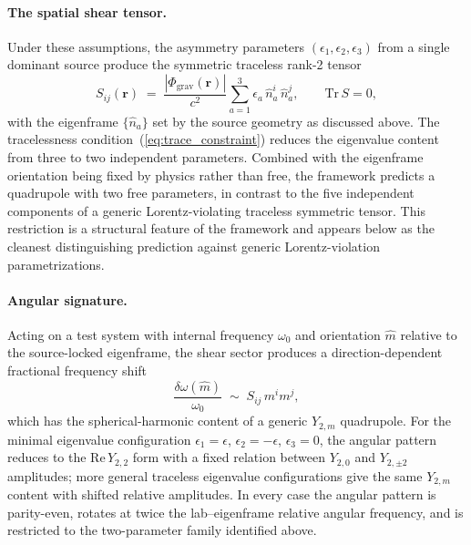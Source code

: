 \documentclass[pdflatex,sn-mathphys-num]{sn-jnl}%
\theoremstyle{thmstyleone}%
\theoremstyle{thmstyletwo}%
\theoremstyle{thmstylethree}%
\begin{document}
\paragraph{The spatial shear tensor.}
Under these assumptions, the asymmetry parameters
$(\epsilon_1,\epsilon_2,\epsilon_3)$ from a single dominant
source produce the symmetric traceless rank-2 tensor
\begin{equation}
    S_{ij}(\mathbf{r})
    \;=\;
    \frac{|\Phi_{\mathrm{grav}}(\mathbf{r})|}{c^2}
    \sum_{a=1}^{3}\epsilon_a\,\hat{n}_a^i\,\hat{n}_a^j,
    \qquad
    \mathrm{Tr}\,S=0,
    \label{eq:S_tensor}
\end{equation}
with the eigenframe $\{\hat{n}_a\}$ set by the source geometry
as discussed above. The tracelessness
condition~(\ref{eq:trace_constraint}) reduces the eigenvalue
content from three to two independent parameters. Combined
with the eigenframe orientation being fixed by physics rather
than free, the framework predicts a quadrupole with two free
parameters, in contrast to the five independent components of a
generic Lorentz-violating traceless symmetric tensor. This
restriction is a structural feature of the framework and
appears below as the cleanest distinguishing prediction
against generic Lorentz-violation parametrizations.

\paragraph{Angular signature.}
Acting on a test system with internal frequency $\omega_0$ and
orientation $\hat{m}$ relative to the source-locked eigenframe,
the shear sector produces a direction-dependent fractional
frequency shift
\begin{equation}
    \frac{\delta\omega(\hat{m})}{\omega_0}
    \;\sim\;
    S_{ij}\,m^i m^j,
    \label{eq:freq_shift_angular}
\end{equation}
which has the spherical-harmonic content of a generic
$Y_{2,m}$ quadrupole. For the minimal eigenvalue configuration
$\epsilon_1=\epsilon$, $\epsilon_2=-\epsilon$, $\epsilon_3=0$,
the angular pattern reduces to the $\mathrm{Re}\,Y_{2,2}$ form
with a fixed relation between $Y_{2,0}$ and $Y_{2,\pm 2}$
amplitudes; more general traceless eigenvalue configurations
give the same $Y_{2,m}$ content with shifted relative
amplitudes. In every case the angular pattern is parity-even,
rotates at twice the lab--eigenframe relative angular
frequency, and is restricted to the two-parameter family
identified above.
\end{document}
